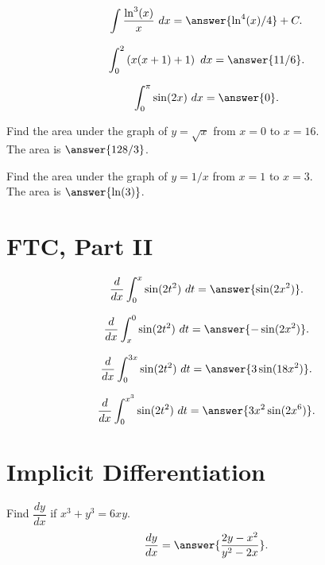 \documentclass{ximera}
\begin{document}
\begin{problem}
\[\int \frac{\ln^3(x)}{x} \ dx = \answer{\ln^4(x) /4} + C.\]
\end{problem}

\begin{problem}
\[\int_0^2  \left(x(x+1) + 1 \right) \ dx = \answer{11/6}.\]
\end{problem}

\begin{problem}
\[\int_0^\pi  \sin(2x) \ dx = \answer{0}.\]
\end{problem}

\begin{problem}
Find the area under the graph of $y = \sqrt x$ from $x=0$ to $x=16$.\\
The area is $\answer{128/3}$.
\end{problem}

\begin{problem}
Find the area under the graph of $y = 1/x$ from $x=1$ to $x=3$.\\
The area is $\answer{\ln(3)}$.
\end{problem}


\section{FTC, Part II}

\begin{problem}
\[\frac{d}{dx} \int_0^x \sin(2t^2) \ dt = \answer{\sin(2x^2)}.\]
\end{problem}

\begin{problem}
\[\frac{d}{dx} \int_x^0 \sin(2t^2) \ dt = \answer{-\sin(2x^2)}.\]
\end{problem}

\begin{problem}
\[\frac{d}{dx} \int_0^{3x} \sin(2t^2) \ dt = \answer{3\sin(18x^2)}.\]
\end{problem}

\begin{problem}
\[\frac{d}{dx} \int_0^{x^3} \sin(2t^2) \ dt = \answer{3x^2\sin(2x^6)}.\]
\end{problem}



\section{Implicit Differentiation}

\begin{problem}
Find $\dfrac{dy}{dx}$ if $x^3 + y^3 = 6xy$.
\[\frac{dy}{dx} = \answer{\frac{2y - x^2}{y^2 - 2x}}.\]
\end{problem}
\end{document}
